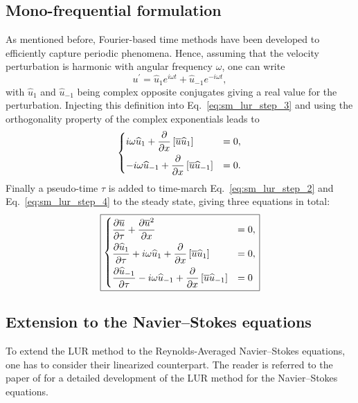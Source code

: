 \subsection{Mono-frequential formulation}
As mentioned before, Fourier-based time methods have been developed to efficiently
capture periodic phenomena.
Hence, assuming that the velocity perturbation is harmonic with 
angular frequency $\omega$, one can write
\begin{equation}
	u^\prime = \widehat{u}_1 e^{i \omega t} + \widehat{u}_{-1} e^{-i \omega t},
\end{equation}
with $\widehat{u}_1$ and $\widehat{u}_{-1}$ being complex opposite conjugates giving a
real value for the perturbation.
Injecting this definition into Eq.~\eqref{eq:sm_lur_step_3} and using
the orthogonality property of the complex exponentials leads
to
\begin{equation}
	\begin{dcases}
		i \omega \widehat{u}_1 +
		\frac{\partial}{\partial x} \left[
		\overline{u} \widehat{u}_1 \right] &= 
		0, \\
		-i \omega \widehat{u}_{-1} +
		\frac{\partial}{\partial x} \left[
		\overline{u} \widehat{u}_{-1} \right] &= 
		0.
	\end{dcases}
	\label{eq:sm_lur_step_4}
\end{equation}
Finally a pseudo-time $\tau$ is added to time-march 
Eq.~\eqref{eq:sm_lur_step_2} and Eq.~\eqref{eq:sm_lur_step_4}
to the steady state, giving three equations in total:
\begin{alignat}{2}
	\fbox{$
	\begin{dcases}
		\frac{\partial \overline{u}}{\partial \tau} +
		\frac{\partial 
			\overline{u}^2}{\partial x} &= 0, \\
		\frac{\partial \widehat{u}_1}{\partial \tau} +
		i \omega \widehat{u}_1 +
			\frac{\partial}{\partial x} \left[
			\overline{u} \widehat{u}_1 \right] &= 
			0, \\
		\frac{\partial \widehat{u}_{-1}}{\partial \tau}
		-i \omega \widehat{u}_{-1} +
			\frac{\partial}{\partial x} \left[
			\overline{u} \widehat{u}_{-1} \right] &= 
			0
	\end{dcases}
	$}
\end{alignat}

\subsection{Extension to the Navier--Stokes equations}
To extend the LUR method to the Reynolds-Averaged
Navier--Stokes equations, one has to consider
their linearized counterpart.
The reader is referred to the paper of \citet{Clark2000} for
a detailed development of the LUR method for the Navier--Stokes
equations.

